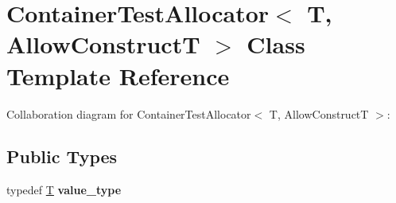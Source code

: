 \hypertarget{class_container_test_allocator}{}\section{Container\+Test\+Allocator$<$ T, Allow\+ConstructT $>$ Class Template Reference}
\label{class_container_test_allocator}


Collaboration diagram for Container\+Test\+Allocator$<$ T, Allow\+ConstructT $>$\+:
\subsection*{Public Types}
\begin{DoxyCompactItemize}
\item 
\mbox{\label{class_container_test_allocator_ab1bb171eccf82e0a5bd1f3a6328da741}} 
typedef \mbox{\hyperlink{struct_t}{T}} {\bfseries value\+\_\+type}
\end{DoxyCompactItemize}
